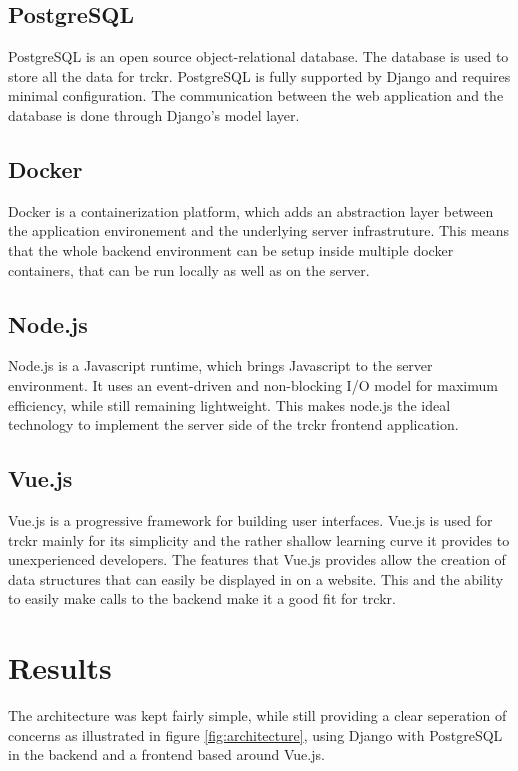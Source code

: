 \documentclass[bibliography=totoc, listof=totocnumbered]{scrartcl}
\begin{document}
\subsection{PostgreSQL}
PostgreSQL is an open source object-relational database.\cite{postgre} The database is used to store all the data for trckr. PostgreSQL is fully
supported by Django and requires minimal configuration. The communication between the web application and the database is done through Django's model layer.

\subsection{Docker}
Docker is a containerization platform, which adds an abstraction layer between the application environement and the underlying server infrastruture.\cite{docker} This means that the whole backend environment can be setup inside multiple docker containers, that can be run locally as well as on the server. 

\subsection{Node.js}
Node.js is a Javascript runtime, which brings Javascript to the server environment.\cite{nodejs} It uses an event-driven and non-blocking I/O model for maximum efficiency, while still remaining lightweight. This makes node.js the ideal technology to implement the server side of the trckr frontend application.

\subsection{Vue.js}
Vue.js is a progressive framework for building user interfaces.\cite{vuejs}
Vue.js is used for trckr mainly for its simplicity and the rather shallow
learning curve it provides to unexperienced developers. The features that Vue.js
provides allow the creation of data structures that can easily be displayed in
on a website. This and the ability to easily make calls to the backend make it a
good fit for trckr.

\section{Results}
The architecture was kept fairly simple, while still providing a clear seperation of concerns as illustrated in figure \ref{fig:architecture}, using Django with PostgreSQL in the backend and a
frontend based around Vue.js.
\end{document}
